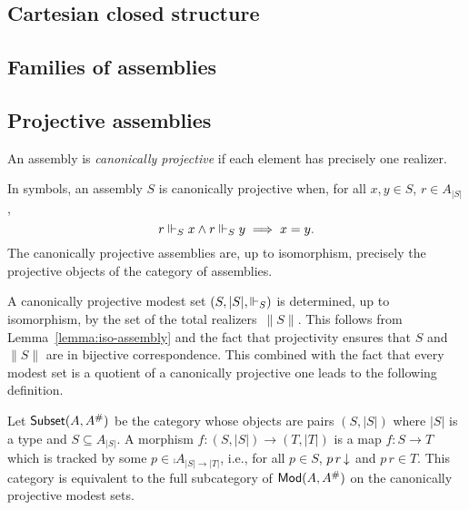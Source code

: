 
\subsection{Cartesian closed structure}
\label{sec:ccc}

\subsection{Families of assemblies}
\label{sec:dependent-types}




\subsection{Projective assemblies}
\label{sec:projective-assemblies}


\begin{definition}
  An assembly is \emph{canonically projective} if each element has
  precisely one realizer.
\end{definition}

\noindent
In symbols, an assembly $S$ is canonically projective when, for all
$x, y \in S$, $r \in A_{|S|}$,
%
\begin{equation*}
  r \Vdash_S x \land r \Vdash_S y \implies x = y.
\end{equation*}
%
The canonically projective assemblies are, up to isomorphism,
precisely the projective objects of the category of assemblies.

A canonically projective modest set $(S, |S|, {\Vdash_S})$ is determined,
up to isomorphism, by the set of the total realizers~$\|S\|$. This
follows from Lemma~\ref{lemma:iso-assembly} and the fact that
projectivity ensures that $S$ and $\|S\|$ are in bijective
correspondence. This combined with the fact that every modest set is a
quotient of a canonically projective one leads to the following
definition.

Let $\mathsf{Subset}(A, A^{\#})$ be the category whose objects are pairs
$(S, |S|)$ where $|S|$ is a type and $S \subseteq A_{|S|}$. A morphism
$f : (S, |S|) \to (T, |T|)$ is a map $f : S \to T$ which is tracked by
some $p \in \comp{A}_{|S| \to |T|}$, i.e., for all $p \in S$,
$p\,r\,{\downarrow}$ and $p\,r \in T$. This category is equivalent to the
full subcategory of $\mathsf{Mod}(A, A^{\#})$ on the canonically projective
modest sets.


